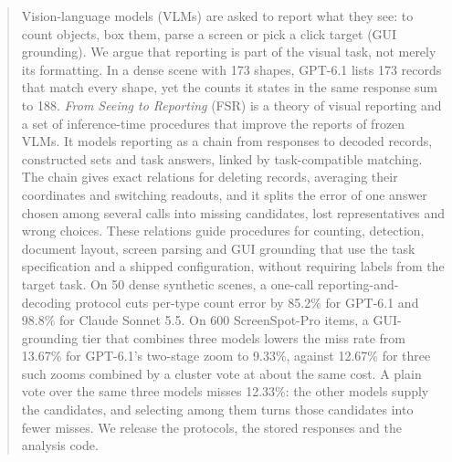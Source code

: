 \begin{abstract}
Vision-language models (VLMs) are asked to report what they see: to count objects, box them, parse a screen or pick a click target (GUI grounding). We argue that reporting is part of the visual task, not merely its formatting. In a dense scene with 173 shapes, GPT-6.1 lists 173 records that match every shape, yet the counts it states in the same response sum to 188. \emph{From Seeing to Reporting} (FSR) is a theory of visual reporting and a set of inference-time procedures that improve the reports of frozen VLMs. It models reporting as a chain from responses to decoded records, constructed sets and task answers, linked by task-compatible matching. The chain gives exact relations for deleting records, averaging their coordinates and switching readouts, and it splits the error of one answer chosen among several calls into missing candidates, lost representatives and wrong choices. These relations guide procedures for counting, detection, document layout, screen parsing and GUI grounding that use the task specification and a shipped configuration, without requiring labels from the target task. On 50 dense synthetic scenes, a one-call reporting-and-decoding protocol cuts per-type count error by 85.2\% for GPT-6.1 and 98.8\% for Claude Sonnet 5.5. On 600 ScreenSpot-Pro items, a GUI-grounding tier that combines three models lowers the miss rate from 13.67\% for GPT-6.1's two-stage zoom to 9.33\%, against 12.67\% for three such zooms combined by a cluster vote at about the same cost. A plain vote over the same three models misses 12.33\%: the other models supply the candidates, and selecting among them turns those candidates into fewer misses. We release the protocols, the stored responses and the analysis code.
\end{abstract}
